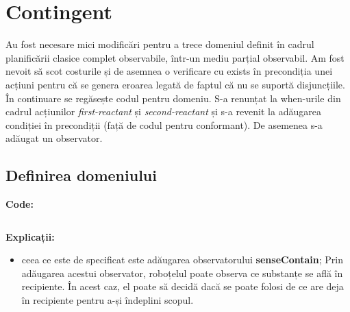 \section{Contingent}
Au fost necesare mici modificări pentru a trece domeniul definit în cadrul planificării clasice complet observabile, într-un mediu parțial observabil. Am fost nevoit să scot costurile și de asemnea o verificare cu exists în precondiția unei acțiuni pentru că se genera eroarea legată de faptul că nu se suportă disjuncțiile. În continuare se regăsește codul pentru domeniu. S-a renunțat la when-urile din cadrul acțiunilor \textit{first-reactant} și \textit{second-reactant} și s-a revenit la adăugarea condiției în precondiții (față de codul pentru conformant). De asemenea s-a adăugat un observator. 

\subsection{Definirea domeniului}
\textbf{Code:}
\inputminted[linenos]{python}{code/Contingent/robchemy.pddl}

\textbf{Explicații:}
\begin{itemize}
    \setlength\itemsep{0em}
    \item ceea ce este de specificat este adăugarea observatorului \textbf{senseContain}; Prin adăugarea acestui observator, roboțelul poate observa ce substanțe se află în recipiente. În acest caz, el poate să decidă dacă se poate folosi de ce are deja în recipiente pentru a-și îndeplini scopul.   

\end{itemize}

